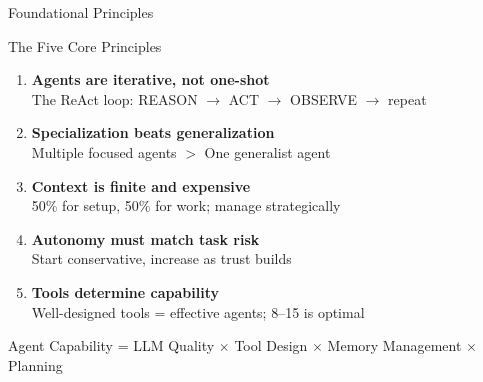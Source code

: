 \documentclass[aspectratio=169, 11pt]{beamer}
\begin{document}
\begin{frame}{Foundational Principles}
    \begin{block}{The Five Core Principles}
        \begin{enumerate}
            \item \textbf{Agents are iterative, not one-shot}\\
            The ReAct loop: REASON $\rightarrow$ ACT $\rightarrow$ OBSERVE $\rightarrow$ repeat

            \item \textbf{Specialization beats generalization}\\
            Multiple focused agents $>$ One generalist agent

            \item \textbf{Context is finite and expensive}\\
            50\% for setup, 50\% for work; manage strategically

            \item \textbf{Autonomy must match task risk}\\
            Start conservative, increase as trust builds

            \item \textbf{Tools determine capability}\\
            Well-designed tools = effective agents; 8--15 is optimal
        \end{enumerate}
    \end{block}

    \vspace{0.3cm}
    \begin{center}
        \textcolor{UofSCGarnet}{\Large Agent Capability = LLM Quality $\times$ Tool Design $\times$ Memory Management $\times$ Planning}
    \end{center}

\end{frame}
\end{document}
